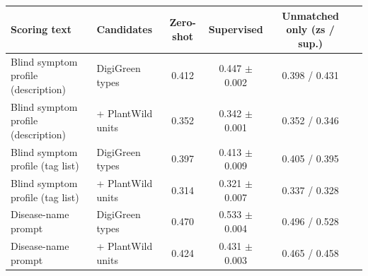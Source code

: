 \begin{tabular}{llcccc}\toprule Scoring text & Candidates & Zero-shot & Supervised & Unmatched only (zs / sup.)\\\midrule
Blind symptom profile (description) & DigiGreen types & 0.412 & 0.447 $\pm$ 0.002 & 0.398 / 0.431\\
Blind symptom profile (description) & + PlantWild units & 0.352 & 0.342 $\pm$ 0.001 & 0.352 / 0.346\\
Blind symptom profile (tag list) & DigiGreen types & 0.397 & 0.413 $\pm$ 0.009 & 0.405 / 0.395\\
Blind symptom profile (tag list) & + PlantWild units & 0.314 & 0.321 $\pm$ 0.007 & 0.337 / 0.328\\
Disease-name prompt & DigiGreen types & 0.470 & 0.533 $\pm$ 0.004 & 0.496 / 0.528\\
Disease-name prompt & + PlantWild units & 0.424 & 0.431 $\pm$ 0.003 & 0.465 / 0.458\\
\bottomrule\end{tabular}
